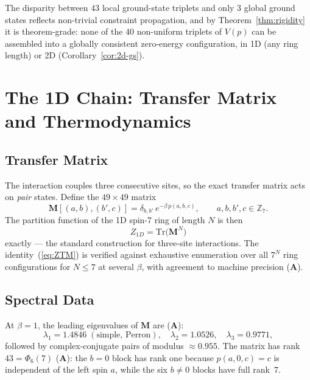 \documentclass[11pt]{article}
\theoremstyle{remark}
\newcommand{\CatA}{\textbf{A}}
\begin{document}
The disparity between 43 local ground-state triplets and only 3 global ground
states reflects non-trivial constraint propagation, and by
Theorem~\ref{thm:rigidity} it is theorem-grade: none of the 40 non-uniform
triplets of $V(p)$ can be assembled into a globally consistent zero-energy
configuration, in 1D (any ring length) or 2D (Corollary~\ref{cor:2d-gs}).

\section{The 1D Chain: Transfer Matrix and Thermodynamics}
\label{sec:1D}

\subsection{Transfer Matrix}

The interaction couples three consecutive sites, so the exact transfer matrix
acts on \emph{pair} states. Define the $49 \times 49$ matrix
\begin{equation}\label{eq:TM}
  \mathbf{M}[(a,b),(b',c)] = \delta_{b,b'}\, e^{-\beta\, p(a,b,c)},
  \qquad a, b, b', c \in \mathbb{Z}_7.
\end{equation}
The partition function of the 1D spin-7 ring of length $N$ is then
\begin{equation}\label{eq:ZTM}
  Z_{1D} = \mathrm{Tr}\bigl(\mathbf{M}^N\bigr)
\end{equation}
exactly --- the standard construction for three-site interactions. The
identity~(\ref{eq:ZTM}) is verified against exhaustive enumeration over all
$7^N$ ring configurations for $N \le 7$ at several $\beta$, with agreement to
machine precision (\CatA{}).

\subsection{Spectral Data}

At $\beta = 1$, the leading eigenvalues of $\mathbf{M}$ are (\CatA{}):
\[
  \lambda_1 = 1.4846 \;(\text{simple, Perron}), \quad
  \lambda_2 = 1.0526, \quad
  \lambda_3 = 0.9771,
\]
followed by complex-conjugate pairs of modulus $\approx 0.955$. The matrix has
rank $43 = \Phi_6(7)$ (\CatA{}): the $b = 0$ block has rank one because
$p(a,0,c) = c$ is independent of the left spin $a$, while the six $b \neq 0$
blocks have full rank~$7$.
\end{document}
